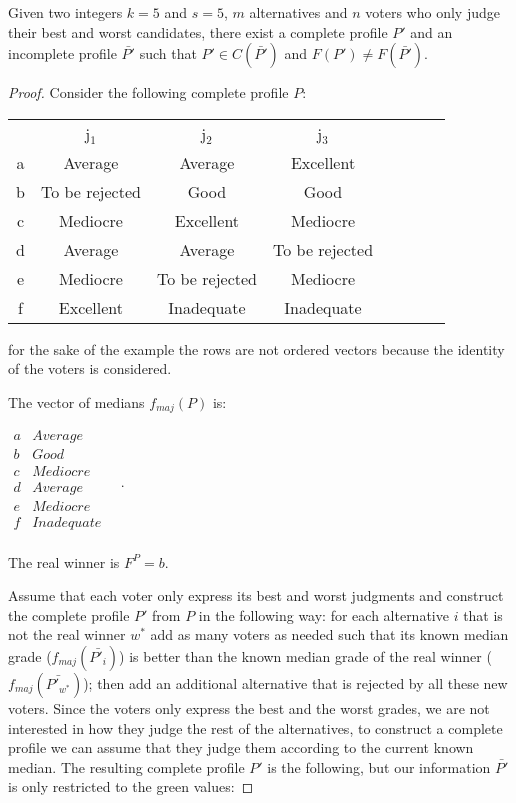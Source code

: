 \documentclass[version=3.21, pagesize, twoside=off, bibliography=totoc, DIV=calc, fontsize=12pt, a4paper]{scrartcl}
\begin{document}
\begin{proposition}
	Given two integers $k=5$ and $s=5$, $m$ alternatives and $n$ voters who only judge their best and worst candidates, there exist a complete profile $P'$ and an incomplete profile $\bar{P'}$ such that $P'\in C(\bar{P'})$ and $F(P')\neq F(\bar{P'})$.
\end{proposition}	

\begin{proof} Consider the following complete profile $P$:

	\begin{center}
		\begin{tabular}{cccccccc}
			& j$_1$ & j$_2$ & j$_3$ \\
			a	&	Average	&	Average	&	Excellent	\\
			b	&	To be rejected	&	Good	&	Good	\\
			c	&	Mediocre	&	Excellent	&	Mediocre	\\
			d	&	Average	&	Average	&	To be rejected	\\
			e	&	Mediocre	&	To be rejected	&	Mediocre	\\
			f	&	Excellent	&	Inadequate	&	Inadequate \\
		\end{tabular}
	\end{center}
	
	
	for the sake of the example the rows are not ordered vectors because the identity of the voters is considered.
	
	The vector of medians $f_{maj}(P)$ is:
	\begin{center}
		$
		\begin{array}{cc}
			a &	Average \\
			b &	Good \\
			c &	Mediocre \\
			d &	Average	\\
			e &	Mediocre \\
			f & Inadequate \\
		\end{array} \quad.
		$
	\end{center}
	The real winner is $F^P=b$. 
	
	Assume that each voter only express its best and worst judgments and construct the complete profile $P'$ from $P$ in the following way: for each alternative $i$ that is not the real winner $w^*$ add as many voters as needed such that its known median grade ($f_{maj}(\bar{P'_i})$) is better than the known median grade of the real winner ($f_{maj}(\bar{P'_{w^*}})$); then add an additional alternative that is rejected by all these new voters. Since the voters only express the best and the worst grades, we are not interested in how they judge the rest of the alternatives, to construct a complete profile we can assume that they judge them according to the current known median. The resulting complete profile $P'$ is the following, but our information $\bar{P'}$ is only restricted to the green values: 


\end{proof}
\end{document}
